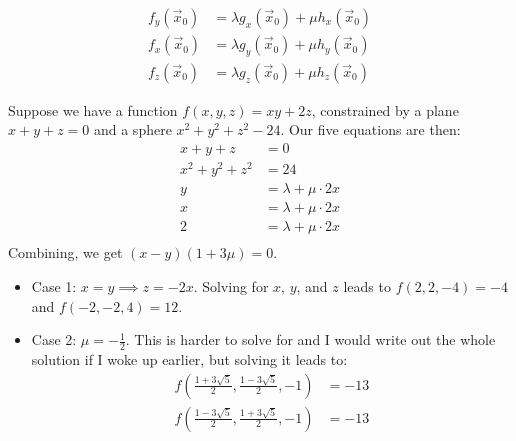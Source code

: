 \begin{itemize}
\begin{align}
        f_y(\vec{x}_0) &= \lambda g_x(\vec{x}_0) + \mu h_x(\vec{x}_0) \\ 
        f_x(\vec{x}_0) &= \lambda g_y(\vec{x}_0) + \mu h_y(\vec{x}_0) \\ 
        f_z(\vec{x}_0) &= \lambda g_z(\vec{x}_0) + \mu h_z(\vec{x}_0)
    \end{align}
    \begin{example}
        Suppose we have a function $f(x,y,z) = xy + 2z$, constrained by a plane $x+y+z=0$ and a sphere $x^2+y^2+z^2-24$. Our five equations are then:
        \begin{align}
            x+y+z &= 0 \\ 
            x^2+y^2+z^2 &= 24 \\ 
            y &= \lambda + \mu \cdot 2x \\ 
            x &= \lambda + \mu \cdot 2x \\ 
            2 &= \lambda + \mu \cdot 2x \\ 
        \end{align}
        Combining, we get $(x-y)(1+3\mu) = 0$.
        \begin{itemize}
            \item Case 1: $x=y \implies z = -2x$. Solving for $x$, $y$, and $z$ leads to $f(2,2,-4)=-4$ and $f(-2,-2,4) = 12$.
            \item Case 2: $\mu = - \frac{1}{2}$. This is harder to solve for and I would write out the whole solution if I woke up earlier, but solving it leads to:
            \begin{align}
                f\left(\frac{1+3\sqrt{5}}{2},\frac{1-3\sqrt{5}}{2}, -1 \right) &= - 13 \\ 
                f\left(\frac{1-3\sqrt{5}}{2},\frac{1+3\sqrt{5}}{2}, -1\right) &= -13
            \end{align}
        \end{itemize}
    \end{example}
\end{itemize}